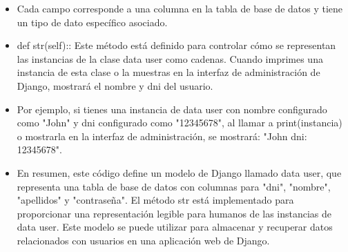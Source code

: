 \documentclass{article}
\begin{document}
\begin{itemize}
		\item Cada campo corresponde a una columna en la tabla de base de datos y tiene un tipo de dato específico asociado.
		
		\item def str(self):: Este método está definido para controlar cómo se representan las instancias de la clase data user como cadenas. Cuando imprimes una instancia de esta clase o la muestras en la interfaz de administración de Django, mostrará el nombre y dni del usuario.
		
		\item Por ejemplo, si tienes una instancia de data user con nombre configurado como "John" y dni configurado como "12345678", al llamar a print(instancia) o mostrarla en la interfaz de administración, se mostrará: "John dni: 12345678".
		
		\item En resumen, este código define un modelo de Django llamado data user, que representa una tabla de base de datos con columnas para "dni", "nombre", "apellidos" y "contraseña". El método str está implementado para proporcionar una representación legible para humanos de las instancias de data user. Este modelo se puede utilizar para almacenar y recuperar datos relacionados con usuarios en una aplicación web de Django.
	\end{itemize}	
		
\end{document}
